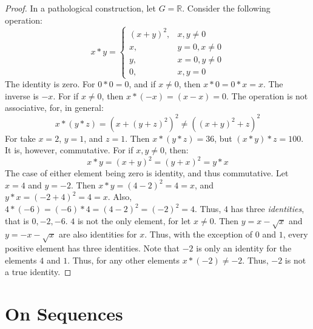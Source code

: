 \documentclass[crop=false,class=book,oneside]{standalone}
\begin{document}
            \begin{proof}
                In a pathological construction, let $G=\mathbb{R}$.
                Consider the following operation:
                \begin{equation}
                    x*y=\begin{cases}
                            (x+y)^{2},&x,y\ne{0}\\
                            x,&y=0,x\ne{0}\\
                            y,&x=0,y\ne{0}\\
                            0,&x,y=0
                        \end{cases}
                \end{equation}
            The identity is zero. For $0*0 = 0$, and if $x\ne 0$, then
            $x*0 = 0*x = x$. The inverse is $-x$. For if $x\ne 0$,
            then $x*(\minus{x})=(x-x)=0$. The operation is not
            associative, for, in general:
            \begin{equation}
                x*(y*z)=(x+(y+z)^{2})^{2}
                \ne((x+y)^{2}+z)^{2}
            \end{equation}
            For take $x=2$, $y=1$, and $z=1$. Then $x*(y*z)=36$,
            but $(x*y)*z=100$. It is, however, commutative.
            For if $x,y\ne{0}$, then:
            \begin{equation}
                x*y=(x+y)^{2}=(y+x)^{2}=y*x
            \end{equation}
            The case of either element being zero is identity,
            and thus commutative. Let $x=4$ and $y=\minus{2}$.
            Then $x*y=(4-2)^{2}=4=x$, and $y*x=(\minus{2}+4)^{2}=4=x$.
            Also, $4*(\minus{6})=(\minus{6})*4=(4-2)^{2}=(\minus{2})^2=4$.
            Thus, $4$ has three \textit{identities}, that is $0,\minus{2},\minus{6}$.
            $4$ is not the only element, for let $x\ne{0}$.
            Then $y=x-\sqrt{x}$ and $y=\minus{x}-\sqrt{x}$ are also identities
            for $x$. Thus, with the exception of $0$ and $1$, every positive element
            has three identities. Note that $\minus{2}$ is only an identity
            for the elements $4$ and $1$. Thus, for any other
            elements $x*(-2)\ne\minus{2}$. Thus, $\minus{2}$ is not a true identity.
            \end{proof}
        \section{On Sequences}
\end{document}
